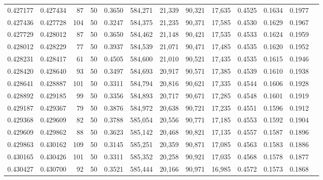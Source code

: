 \begin{tabular}{rrrrrrrrrrrrr}
0.427177 & 0.427434 &    87 &  50 &                                     0.3650 & 584,271 &  21,339 &  90,321 &  17,635 & 0.4525 & 0.1634 & 0.1977 \\
0.427436 & 0.427728 &   104 &  50 &                                     0.3247 & 584,375 &  21,235 &  90,371 &  17,585 & 0.4530 & 0.1629 & 0.1967 \\
0.427729 & 0.428012 &    87 &  50 &                                     0.3650 & 584,462 &  21,148 &  90,421 &  17,535 & 0.4533 & 0.1624 & 0.1959 \\
0.428012 & 0.428229 &    77 &  50 &                                     0.3937 & 584,539 &  21,071 &  90,471 &  17,485 & 0.4535 & 0.1620 & 0.1952 \\
0.428231 & 0.428417 &    61 &  50 &                                     0.4505 & 584,600 &  21,010 &  90,521 &  17,435 & 0.4535 & 0.1615 & 0.1946 \\
0.428420 & 0.428640 &    93 &  50 &                                     0.3497 & 584,693 &  20,917 &  90,571 &  17,385 & 0.4539 & 0.1610 & 0.1938 \\
0.428641 & 0.428887 &   101 &  50 &                                     0.3311 & 584,794 &  20,816 &  90,621 &  17,335 & 0.4544 & 0.1606 & 0.1928 \\
0.428892 & 0.429185 &    99 &  50 &                                     0.3356 & 584,893 &  20,717 &  90,671 &  17,285 & 0.4548 & 0.1601 & 0.1919 \\
0.429187 & 0.429367 &    79 &  50 &                                     0.3876 & 584,972 &  20,638 &  90,721 &  17,235 & 0.4551 & 0.1596 & 0.1912 \\
0.429368 & 0.429609 &    82 &  50 &                                     0.3788 & 585,054 &  20,556 &  90,771 &  17,185 & 0.4553 & 0.1592 & 0.1904 \\
0.429609 & 0.429862 &    88 &  50 &                                     0.3623 & 585,142 &  20,468 &  90,821 &  17,135 & 0.4557 & 0.1587 & 0.1896 \\
0.429863 & 0.430162 &   109 &  50 &                                     0.3145 & 585,251 &  20,359 &  90,871 &  17,085 & 0.4563 & 0.1583 & 0.1886 \\
0.430165 & 0.430426 &   101 &  50 &                                     0.3311 & 585,352 &  20,258 &  90,921 &  17,035 & 0.4568 & 0.1578 & 0.1877 \\
0.430427 & 0.430700 &    92 &  50 &                                     0.3521 & 585,444 &  20,166 &  90,971 &  16,985 & 0.4572 & 0.1573 & 0.1868 \\

\end{tabular}
